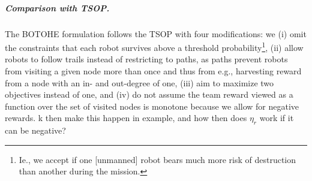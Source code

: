 \documentclass[11pt, oneside]{article}
\begin{document}
%
%


\subparagraph{Comparison with TSOP.}
The BOTOHE formulation follows the TSOP \cite{jorgensen2018team} with four modifications: we (i) omit the constraints that each robot survives above a threshold probability\footnote{Ie., we accept if one [unmanned] robot bears much more risk of destruction than another during the mission.}, (ii) allow robots to follow trails instead of restricting to paths, as paths prevent robots from visiting a given node more than once and thus from e.g., harvesting reward from a node with an in- and out-degree of one, (iii) aim to maximize two objectives instead of one, and (iv) do not assume the team reward viewed as a function over the set of visited nodes is monotone because we allow for negative rewards.
{\color{red} k then make this happen in example, and how then does $\eta_r$ work if it can be negative? }
\end{document}
